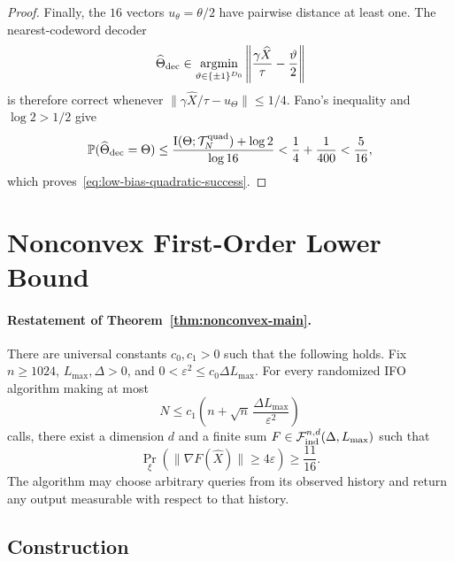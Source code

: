 \documentclass{article}
\theoremstyle{definition}
\newcommand{\Prob}{\mathbb{P}}
\begin{document}
\begin{proof}
Finally, the $16$ vectors $u_\theta=\theta/2$ have pairwise distance at least one.  The
nearest-codeword decoder
\begin{equation}
 \widehat\Theta_{\rm dec}
 \in\operatorname*{argmin}_{\vartheta\in\{\pm1\}^{D_0}}
 \left\|\frac{\gamma\widehat X}{\tau}-\frac\vartheta2\right\|
\end{equation}
is therefore correct whenever
$\|\gamma\widehat X/\tau-u_\Theta\|\le1/4$.  Fano's inequality
\citep{yu1997assouad} and
$\log2>1/2$ give
\begin{equation}
 \Prob(\widehat\Theta_{\rm dec}=\Theta)
 \le\frac{\mathrm I(\Theta;\mathcal T_N^{\rm quad})+\log2}{\log16}
 <\frac14+\frac1{400}<\frac5{16},
\end{equation}
which proves~\eqref{eq:low-bias-quadratic-success}.
\end{proof}

\section{Nonconvex First-Order Lower Bound}
\label{app:nonconvex}

\paragraph{Restatement of Theorem~\ref{thm:nonconvex-main}.}
There are universal constants $c_0,c_1>0$ such that the following holds.
Fix $n\ge1024$, $L_{\max},\Delta>0$, and
$0<\varepsilon^2\le c_0\Delta L_{\max}$.  For every randomized IFO algorithm
making at most
\begin{equation}
 N\le c_1\left(n+\sqrt n\,
       \frac{\Delta L_{\max}}{\varepsilon^2}\right)
 \label{eq:restated-nonconvex-budget}
\end{equation}
calls, there exist a dimension $d$ and a finite sum
$F\in\mathcal F_{\rm ind}^{n,d}(\Delta,L_{\max})$ such that
\begin{equation}
 \Pr_\xi\!\left(\|\nabla F(\widehat X)\|\ge4\varepsilon\right)
 \ge\frac{11}{16}.
 \label{eq:restated-nonconvex-failure}
\end{equation}
The algorithm may choose arbitrary queries from its observed history and return
any output measurable with respect to that history.

\subsection{Construction}
\end{document}
